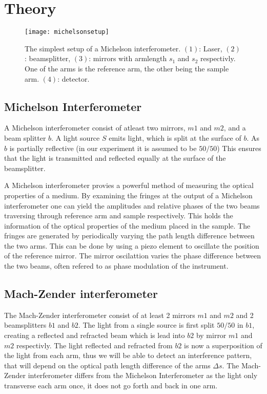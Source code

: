 \section{Theory}
\begin{figure*}
    \centering
    \texttt{[image: michelsonsetup]}
    \caption{The simplest setup of a Michelson interferometer. $(1)$: Laser, $(2)$: beamsplitter, $(3)$: mirrors with armlength $s_1$ and $s_2$ respectivly. One of the arms is the reference arm, the other being the sample arm. $(4)$: detector.}
    \label{fig:configuration}
\end{figure*}
\subsection{Michelson Interferometer}
A Michelson interferometer consist of atleast two mirrors, $m1$ and $m2$, and a beam splitter $b$. A light source $S$ emits light, which is split at the surface of $b$. As $b$ is partially reflective (in our experiment it is assumed to be $50/50$) This ensures that the light is transmitted and reflected equally at the surface of the beamsplitter.

A Michelson interferometer provies a powerful method of measuring the optical properties of a medium. By examining the fringes at the output of a Michelson interferometer one can yield the amplitudes and relative phases of the two beams traversing through reference arm and sample respectively. This holds the information of the optical properties of the medium placed in the sample. The fringes are generated by periodically varying the path length difference between the two arms. This can be done by using a piezo element to oscillate the position of the reference mirror. The mirror oscilattion varies the phase difference between the two beams, often refered to as phase modulation of the instrument.


\subsection{Mach-Zender interferometer}

The Mach-Zender interferometer consist of at least 2 mirrors $m1$ and $m2$ and 2 beamsplitters $b1$ and $b2$. The light from a single source is first split $50/50$ in $b1$, creating a reflected and refracted beam which is lead into $b2$ by mirror $m1$ and $m2$ respectivly. The light reflected and refracted from $b2$ is now a superposition of the light from each arm, thus we will be able to detect an interference pattern, that will depend on the optical path length difference of the arms $\Delta s$. The Mach-Zender interferometer differs from the Michelson Interferometer as the light only transverse each arm once, it does not go forth and back in one arm. 

